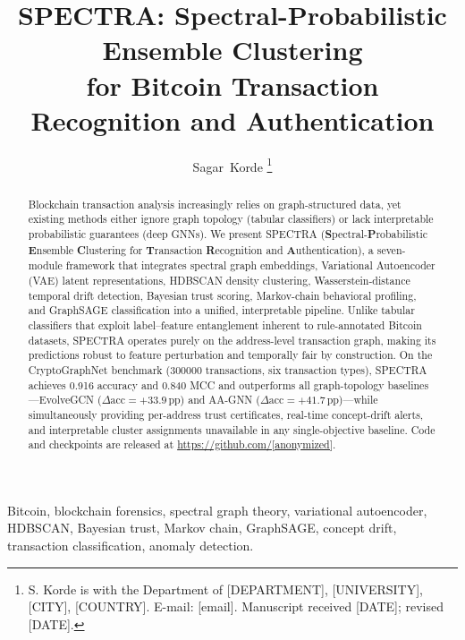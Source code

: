 \documentclass[journal]{IEEEtran}
\newcommand{\spectra}{\textsc{SPECTRA}}
\begin{document}
\title{\spectra: Spectral-Probabilistic Ensemble Clustering\\
       for Bitcoin Transaction Recognition and Authentication}

\author{Sagar~Korde%
  \thanks{S. Korde is with the Department of [DEPARTMENT],
    [UNIVERSITY], [CITY], [COUNTRY].
    E-mail: [email].
    Manuscript received [DATE]; revised [DATE].}}

\begin{abstract}
Blockchain transaction analysis increasingly relies on graph-structured data,
yet existing methods either ignore graph topology (tabular classifiers) or
lack interpretable probabilistic guarantees (deep GNNs).
We present \spectra{}
(\textbf{S}pectral-\textbf{P}robabilistic \textbf{E}nsemble \textbf{C}lustering
for \textbf{T}ransaction \textbf{R}ecognition and \textbf{A}uthentication),
a seven-module framework that integrates spectral graph embeddings,
Variational Autoencoder (VAE) latent representations, HDBSCAN density
clustering, Wasserstein-distance temporal drift detection, Bayesian trust
scoring, Markov-chain behavioral profiling, and GraphSAGE classification
into a unified, interpretable pipeline.
Unlike tabular classifiers that exploit label--feature entanglement inherent
to rule-annotated Bitcoin datasets, \spectra{} operates purely on the
address-level transaction graph, making its predictions robust to feature
perturbation and temporally fair by construction.
On the CryptoGraphNet benchmark (\num{300000} transactions, six transaction
types), \spectra{} achieves \num{0.916} accuracy and \num{0.840} MCC and
outperforms all graph-topology baselines---EvolveGCN
($\Delta\text{acc} = {+33.9}$\,pp) and AA-GNN
($\Delta\text{acc} = {+41.7}$\,pp)---while simultaneously providing
per-address trust certificates, real-time concept-drift alerts, and
interpretable cluster assignments unavailable in any single-objective baseline.
Code and checkpoints are released at \url{https://github.com/[anonymized]}.
\end{abstract}

\begin{IEEEkeywords}
Bitcoin, blockchain forensics, spectral graph theory, variational autoencoder,
HDBSCAN, Bayesian trust, Markov chain, GraphSAGE, concept drift,
transaction classification, anomaly detection.
\end{IEEEkeywords}
\end{document}

